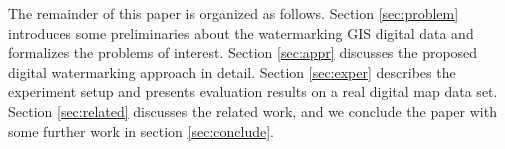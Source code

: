 The remainder of this paper is organized as follows. Section 
\ref{sec:problem}
 introduces some preliminaries about the watermarking GIS digital data
and formalizes the problems of interest. 
Section \ref{sec:appr}  
discusses the proposed digital watermarking approach in detail. 
Section \ref{sec:exper} describes the experiment setup and presents
evaluation results on a real digital map data set. 
Section \ref{sec:related} discusses the related work, and
we conclude the paper with some further work in section \ref{sec:conclude}.

%
